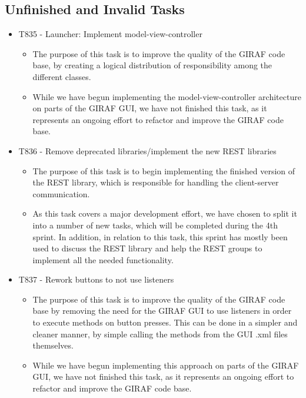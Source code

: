 \subsection{Unfinished and Invalid Tasks}\label{S3Invalid}
\begin{itemize}
  \item T835 - Launcher: Implement model-view-controller
  \begin{itemize}
      \item The purpose of this task is to improve the quality of the GIRAF code
      base, by creating a logical distribution of responsibility among the different
      classes.
      \item While we have begun implementing the model-view-controller architecture
      on parts of the GIRAF GUI, we have not finished this task, as it represents
      an ongoing effort to refactor and improve the GIRAF code base.
  \end{itemize}
  \item T836 - Remove deprecated libraries/implement the new REST libraries
  \begin{itemize}
      \item The purpose of this task is to begin implementing the finished version
      of the REST library, which is responsible for handling the client-server
      communication.
      \item As this task covers a major development effort, we have chosen to split
      it into a number of new tasks, which will be completed during the 4th sprint.
      In addition, in relation to this task, this sprint has mostly been used to
      discuss the REST library and help the REST groups to implement all the needed
      functionality.  
      \end{itemize}
  \item T837 - Rework buttons to not use listeners
  \begin{itemize}
    \item The purpose of this task is to improve the quality of the GIRAF code
    base by removing the need for the GIRAF GUI to use listeners in order to
    execute methods on button presses. This can be done in a simpler and cleaner
    manner, by simple calling the methods from the GUI .xml files themselves.
    \item While we have begun implementing this approach on parts of the GIRAF
    GUI, we have not finished this task, as it represents an ongoing effort to
    refactor and improve the GIRAF code base.
  \end{itemize}
\end{itemize}

